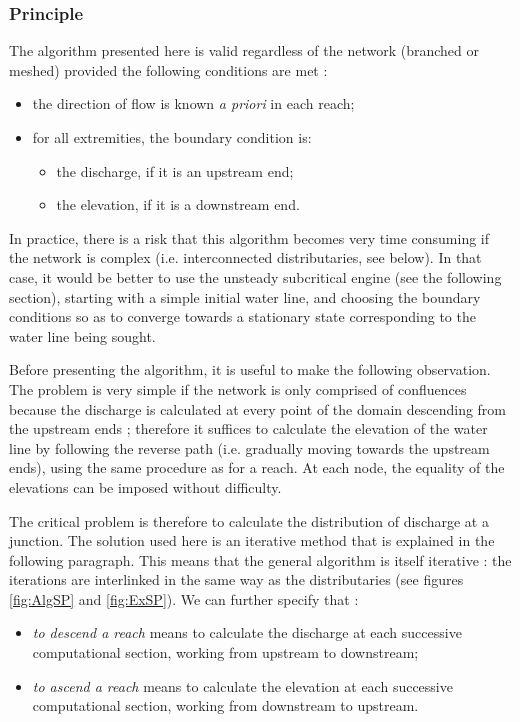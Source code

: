 \subsubsection{Principle}

The algorithm presented here is valid regardless of the network (branched or meshed) provided the following conditions are met :
\begin{itemize}
 \item the direction of flow is known \textit{a priori} in each reach;
 \item for all extremities, the boundary condition is:
   \begin{itemize}
     \item the discharge, if it is an upstream end;
     \item the elevation, if it is a downstream end.
    \end{itemize}
\end{itemize}

In practice, there is a risk that this algorithm becomes very time consuming if the network is complex (i.e. interconnected distributaries, see below). In that case, it would be better to use the unsteady subcritical engine (see the following section), starting with a simple initial water line, and choosing the boundary conditions so as to converge towards a stationary state corresponding to the water line being sought.

Before presenting the algorithm, it is useful to make the following observation. The problem is very simple if the network is only comprised of confluences because the discharge is calculated at every point of the domain descending from the upstream ends ; therefore it suffices to calculate the elevation of the water line by following the reverse path (i.e. gradually moving towards the upstream ends), using the same procedure as for a reach. At each node, the equality of the elevations can be imposed without difficulty.

The critical problem is therefore to calculate the distribution of discharge at a junction. The solution used here is an iterative method that is explained in the following paragraph. This means that the general algorithm is itself iterative : the iterations are interlinked in the same way as the distributaries (see figures \ref{fig:AlgSP} and \ref{fig:ExSP}). We can further specify that :
\begin{itemize}
 \item \textit{to descend a reach} means to calculate the discharge at each successive computational section, working from upstream to downstream;
 \item \textit{to ascend a reach} means to calculate the elevation at each successive computational section, working from downstream to upstream.
\end{itemize}

